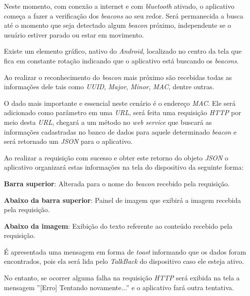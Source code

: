 Neste momento, com conexão a internet e com \textit{bluetooth} ativado, o aplicativo começa a fazer a verificação dos \textit{beacons} ao seu redor. Será permanecida a busca até o momento que seja detectado algum \textit{beacon} próximo, independente se o usuário estiver parado ou estar em movimento.

Existe um elemento gráfico, nativo do \textit{Android}, localizado no centro da tela que fica em constante rotação indicando que o aplicativo está buscando os \textit{beacons}.

Ao realizar o reconhecimento do \textit{beacon} mais próximo são recebidas todas as informações dele tais como \textit{UUID}, \textit{Major}, \textit{Minor}, \textit{MAC}, dentre outras. 

O dado mais importante e essencial neste cenário é o endereço \textit{MAC}. Ele será adicionado como parâmetro em uma \textit{URL}, será feita uma requisição \textit{HTTP} por meio desta \textit{URL}, chegará a um método no \textit{web service} que buscará as informações cadastradas no banco de dados para aquele determinado \textit{beacon} e será retornado um \textit{JSON} para o aplicativo.

Ao realizar a requisição com sucesso e obter este retorno do objeto \textit{JSON} o aplicativo organizará estas informações na tela do dispositivo da seguinte forma:

\textbf{Barra superior}: Alterada para o nome do \textit{beacon} recebido pela requisição.

\textbf{Abaixo da barra superior}: Painel de imagem que exibirá a imagem recebida pela requisição.

\textbf{Abaixo da imagem}: Exibição do texto referente ao conteúdo recebido pela requisição.

É apresentada uma mensagem em forma de \textit{toast} informando que os dados foram encontrados, pois ela será lida pelo \textit{TalkBack} do dispositivo caso ele esteja ativo.

No entanto, se ocorrer alguma falha na requisição \textit{HTTP} será exibida na tela a mensagem ''[Erro] Tentando novamente...'' e o aplicativo fará outra tentativa.

